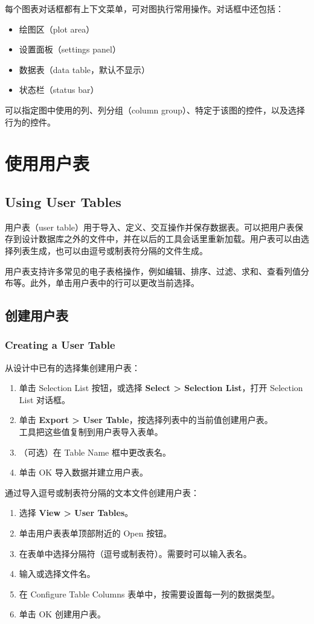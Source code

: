每个图表对话框都有上下文菜单，可对图执行常用操作。对话框中还包括：
\begin{itemize}
  \item 绘图区（plot area）
  \item 设置面板（settings panel）
  \item 数据表（data table，默认不显示）
  \item 状态栏（status bar）
\end{itemize}

可以指定图中使用的列、列分组（column group）、特定于该图的控件，以及选择行为的控件。

\section{使用用户表}
\subsection*{Using User Tables}

用户表（user table）用于导入、定义、交互操作并保存数据表。可以把用户表保存到设计数据库之外的文件中，并在以后的工具会话里重新加载。用户表可以由选择列表生成，也可以由逗号或制表符分隔的文件生成。

用户表支持许多常见的电子表格操作，例如编辑、排序、过滤、求和、查看列值分布等。此外，单击用户表中的行可以更改当前选择。

\subsection{创建用户表}
\subsubsection*{Creating a User Table}

从设计中已有的选择集创建用户表：
\begin{enumerate}
  \item 单击 Selection List 按钮，或选择 \textbf{Select > Selection List}，打开 Selection List 对话框。
  \item 单击 \textbf{Export > User Table}，按选择列表中的当前值创建用户表。\\
        工具把这些值复制到用户表导入表单。
  \item （可选）在 Table Name 框中更改表名。
  \item 单击 OK 导入数据并建立用户表。
\end{enumerate}

通过导入逗号或制表符分隔的文本文件创建用户表：
\begin{enumerate}
  \item 选择 \textbf{View > User Tables}。
  \item 单击用户表表单顶部附近的 Open 按钮。
  \item 在表单中选择分隔符（逗号或制表符）。需要时可以输入表名。
  \item 输入或选择文件名。
  \item 在 Configure Table Columns 表单中，按需要设置每一列的数据类型。
  \item 单击 OK 创建用户表。
\end{enumerate}

